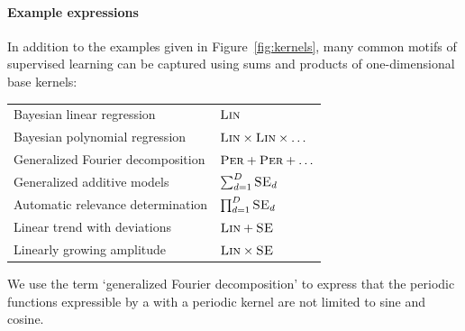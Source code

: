 \documentclass[twoside]{article}
\begin{document}
\paragraph{Example expressions}

In addition to the examples given in Figure~\ref{fig:kernels}, many common motifs of supervised learning can be captured using sums and products of one-dimensional base kernels:

\begin{tabular}{l|l}
Bayesian linear regression & $\textsc{Lin}$ \\
Bayesian polynomial regression & $\textsc{Lin} \times \textsc{Lin} \times \ldots$\\
Generalized Fourier decomposition & $\textsc{Per} + \textsc{Per} + \ldots$ \\
Generalized additive models & $\sum_{d=1}^D \textsc{SE}_d$ \\
Automatic relevance determination & $\prod_{d=1}^D \textsc{SE}_d$ \\
Linear trend with deviations & $\textsc{Lin} + \textsc{SE}$ \\
Linearly growing amplitude & $\textsc{Lin} \times \textsc{SE}$
\end{tabular}

We use the term `generalized Fourier decomposition' to express that the periodic functions expressible by a \gp{} with a periodic kernel are not limited to sine and cosine.




%
\end{document}
